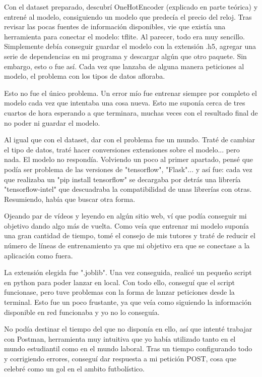 	Con el dataset preparado, descubrí OneHotEncoder (explicado en parte teórica) y entrené al modelo, consiguiendo un modelo que predecía el precio del reloj. Tras revisar las pocas fuentes de información disponibles, vie que existía una herramienta para conectar el modelo: tflite. Al parecer, todo era muy sencillo. Simplemente debía conseguir guardar el modelo con la extensión .h5, agregar una serie de dependencias en mi programa y descargar algún que otro paquete. Sin embargo, esto o fue así. Cada vez que lanzaba de alguna manera peticiones al modelo, el problema con los tipos de datos afloraba.
	
	Esto no fue el único problema. Un error mío fue entrenar siempre por completo el modelo cada vez que intentaba una cosa nueva. Esto me suponía cerca de tres cuartos de hora esperando a que terminara, muchas veces con el resultado final de no poder ni guardar el modelo. 
	
	Al igual que con el dataset, dar con el problema fue un mundo. Traté de cambiar el tipo de datos, traté hacer conversiones extensiones sobre el modelo... pero nada. El modelo no respondía. Volviendo un poco al primer apartado, pensé que podía ser problema de las versiones de "tensorflow", "Flask"... y así fue: cada vez que realizaba un "pip install tensorflow" se decargaba por detrás una librería "tensorflow-intel" que descuadraba la compatibilidad de unas librerías con otras. Resumiendo, había que buscar otra forma.
	
	Ojeando par de vídeos y leyendo en algún sitio web, ví que podía conseguir mi objetivo dando algo más de vuelta. Como veía que entrenar mi modelo suponía una gran cantidad de tiempo, tomé el consejo de mis tutores y traté de reducir el número de líneas de entrenamiento ya que mi objetivo era que se conectase a la aplicación como fuera.
	
	La extensión elegida fue ".joblib". Una vez conseguida, realicé un pequeño script en python para poder lanzar en local. Con todo ello, conseguí que el script funcionase, pero tuve problemas con la forma de lanzar peticiones desde la terminal. Esto fue un poco frustante, ya que veía como siguiendo la información disponible en red funcionaba y yo no lo conseguía.
	
	No podía destinar el tiempo del que no disponía en ello, así que intenté trabajar con Postman, herramienta muy intuitiva que yo había utilizado tanto en el mundo estudiantil como en el mundo laboral. Tras un tiempo configurando todo y corrigiendo errores, conseguí dar respuesta a mi petición POST, cosa que celebré como un gol en el ambito futbolístico.
	
